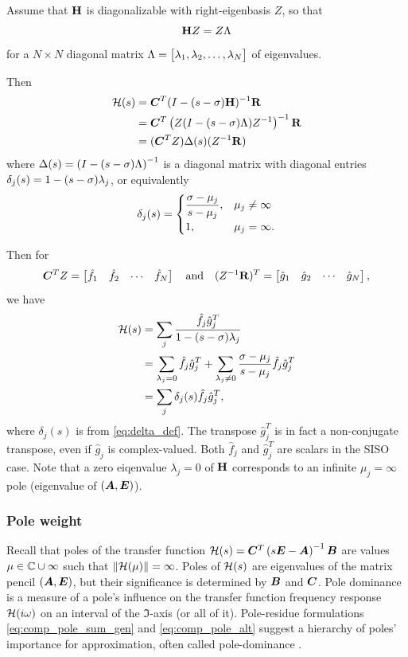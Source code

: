  Assume that $\textbf{\textup{H}}$ is diagonalizable with right-eigenbasis $Z$, so that    
\[
\textbf{\textup{H}} Z =  Z \Lambda 
\] 
for a $N\times N$ diagonal matrix $\Lambda=\begin{bmatrix} \lambda_1, \lambda_2,\ldots,\lambda_N\end{bmatrix}$ of eigenvalues.

Then
\begin{align}
\mathcal{H}(s) &= \bm{C}^T (I - (s-\sigma)\textbf{\textup{H}} )^{-1} \textbf{\textup{R}}\nonumber\\
&= \bm{C}^T \left( Z (I - (s-\sigma)\Lambda )Z^{-1} \right)^{-1} \textbf{\textup{R}} \nonumber\\
&= (\bm{C}^T Z) \Delta(s) (Z^{-1}\textbf{\textup{R}})
\end{align}
where $\Delta(s)=\left( I - (s-\sigma)\Lambda \right)^{-1}$ is a diagonal matrix with diagonal entries $\delta_{j}(s) =1-(s-\sigma)\lambda_j$, or equivalently
\begin{equation}
\delta_{j}(s) =
\begin{cases}
\dfrac{\sigma-\mu_j}{s-\mu_j},   & \mu_j \neq \infty\\
1, & \mu_j = \infty. 
\end{cases}
\label{eq:delta_def}
\end{equation}

Then for 
\[
\bm{C}^T Z = \begin{bmatrix} \hat{f}_1 & \hat{f}_2 &\cdots&\hat{f}_N\end{bmatrix} \quad\text{and}\quad
(Z^{-1}\textbf{\textup{R}})^T = \begin{bmatrix} \hat{g}_1 & \hat{g}_2 &\cdots&\hat{g}_N\end{bmatrix},
\]
we have
\begin{align}
\mathcal{H}(s) &= \sum_j \frac{\hat{f}_j\hat{g}_j^T}{1-(s-\sigma)\lambda_j} \label{eq:comp_eig_sum}\\
&= \sum_{\lambda_j=0} \hat{f}_j\hat{g}_j^T + \sum_{\lambda_j \neq 0} \frac{\sigma-\mu_j}{s-\mu_j}\hat{f}_j\hat{g}_j^T\nonumber\\
&= \sum_j \delta_j(s) \hat{f}_j \hat{g}_j^T,\label{eq:comp_pole_alt} 
\end{align}
where $\delta_j(s)$ is from \eqref{eq:delta_def}. The transpose $\hat{g}_j^T$ is in fact a non-conjugate transpose, even if $\hat{g}_j$ is complex-valued.   Both  $\hat{f}_j$ and $\hat{g}_j^T$ are scalars in the SISO case.
Note that a zero eiqenvalue $\lambda_j=0$ of $\textbf{\textup{H}}$ corresponds to an infinite $\mu_j=\infty$ pole (eigenvalue of $(\bm{A},\bm{E})$). 


\subsubsection{Pole weight}\label{sec:pole_dominance}
Recall that poles of the transfer function $\mathcal{H}(s) = \bm{C}^T\left(s\bm{E}-\bm{A}\right)^{-1}\bm{B}$ are values $\mu\in\mathbb{C} \cup \infty$ such that $\|\mathcal{H}(\mu)\|=\infty$. Poles of $\mathcal{H}(s)$ are eigenvalues of the matrix pencil $(\bm{A},\bm{E})$, but their significance is determined by $\bm{B}$ and $\bm{C}$. Pole dominance is a measure of a pole's influence on the transfer function frequency response $\mathcal{H}(i \omega)$ on an interval of the $\Im$-axis (or all of it).   
Pole-residue formulations  \eqref{eq:comp_pole_sum_gen} and \eqref{eq:comp_pole_alt} suggest a hierarchy of poles' importance for approximation, often called pole-dominance \cite{Aguirre}.  

